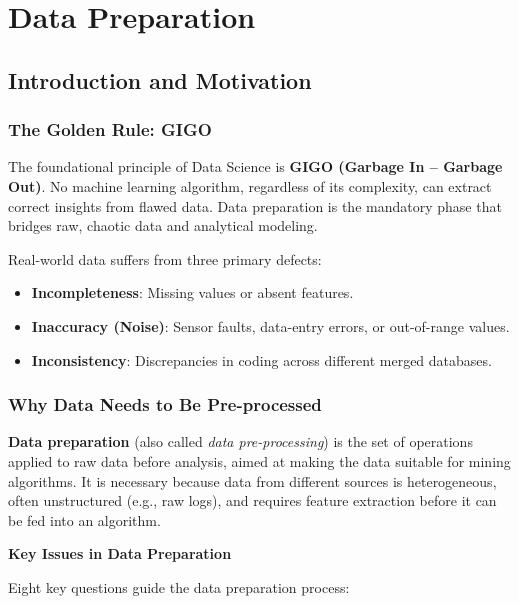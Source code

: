 \documentclass[11pt]{article}
\theoremstyle{smallexample}
\newcommand{\vs}{\vspace{0.2\baselineskip}}
\begin{document}
\section{Data Preparation}

\subsection{Introduction and Motivation}

\subsubsection{The Golden Rule: GIGO}

The foundational principle of Data Science is \textbf{GIGO (Garbage In -- Garbage Out)}. No machine learning algorithm, regardless of its complexity, can extract correct insights from flawed data. Data preparation is the mandatory phase that bridges raw, chaotic data and analytical modeling.

Real-world data suffers from three primary defects:
\begin{itemize}
    \item \textbf{Incompleteness}: Missing values or absent features.
    \item \textbf{Inaccuracy (Noise)}: Sensor faults, data-entry errors, or out-of-range values.
    \item \textbf{Inconsistency}: Discrepancies in coding across different merged databases.
\end{itemize}

\subsubsection{Why Data Needs to Be Pre-processed}


  \textbf{Data preparation} (also called \emph{data pre-processing}) is the set of operations
  applied to raw data before analysis, aimed at making the data suitable for mining algorithms.
  It is necessary because data from different sources is heterogeneous, often unstructured (e.g.,
  raw logs), and requires feature extraction before it can be fed into an algorithm.

\vs

\textbf{Key Issues in Data Preparation}

Eight key questions guide the data preparation process:
\end{document}

